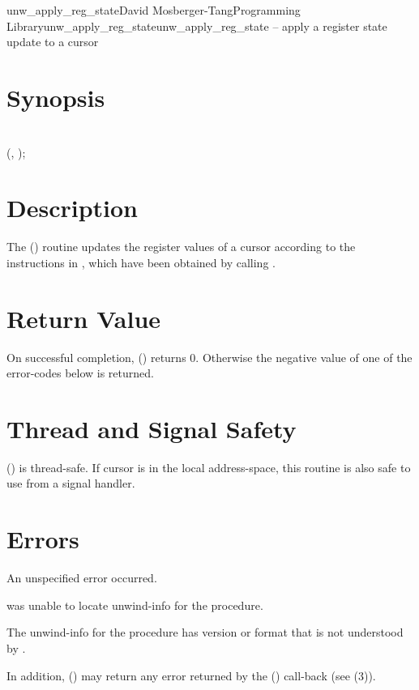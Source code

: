 \documentclass{article}
\begin{document}
\begin{Name}{3}{unw\_apply\_reg\_state}{David Mosberger-Tang}{Programming Library}{unw\_apply\_reg\_state}unw\_apply\_reg\_state -- apply a register state update to a cursor
\end{Name}

\section{Synopsis}

\\

(,
);\\

\section{Description}

The () routine updates the register values
of a cursor according to the instructions in ,
which have been obtained by calling .

\section{Return Value}

On successful completion, () returns 0.
Otherwise the negative value of one of the error-codes below is
returned.

\section{Thread and Signal Safety}

() is thread-safe.  If cursor  is
in the local address-space, this routine is also safe to use from a
signal handler.

\section{Errors}

\begin{Description}
\item[\Const{UNW\_EUNSPEC}] An unspecified error occurred.
\item[\Const{UNW\_ENOINFO}]  was unable to locate
  unwind-info for the procedure.
\item[\Const{UNW\_EBADVERSION}] The unwind-info for the procedure has
  version or format that is not understood by .
\end{Description}
In addition, () may return any error
returned by the () call-back (see
(3)).
\end{document}
